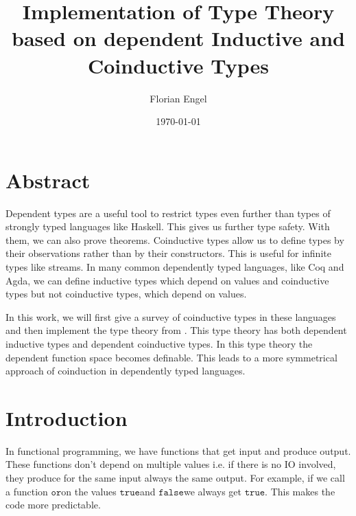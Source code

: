 \documentclass[a4paper,cleardoubleempty,BCOR1cm]{scrbook}
\author{Florian Engel}
\date{\today}
\title{Implementation of Type Theory based on dependent Inductive and Coinductive Types}
\begin{document}
\maketitle


\chapter*{Abstract}
  Dependent types are a useful tool to restrict types even further than types of
  strongly typed languages like Haskell. This gives us further type safety. With
  them, we can also prove theorems. Coinductive types allow us to define types by
  their observations rather than by their constructors. This is useful for
  infinite types like streams. In many common dependently typed languages, like
  Coq and Agda, we can define inductive types which depend on values and
  coinductive types but not coinductive types, which depend on values.

In this work, we will first give a survey of coinductive types in these
languages and then implement the type theory from \cite{basold2016type}. This
type theory has both dependent inductive types and dependent coinductive
types. In this type theory the dependent function space becomes definable.
This leads to a more symmetrical approach of coinduction in dependently typed
languages.

\setcounter{tocdepth}{2}
\tableofcontents

\chapter{Introduction}
\label{sec:orgd46be11}
In functional programming, we have functions that get input and produce
output. These functions don't depend on multiple values i.e. if there is no IO
involved, they produce for the same input always the same output. For example,
if we call a function $\mathtt{or}$\;on the values $\mathtt{true}$\;and $\mathtt{false}$\;we always get
$\mathtt{true}$. This makes the code more predictable.
\end{document}
